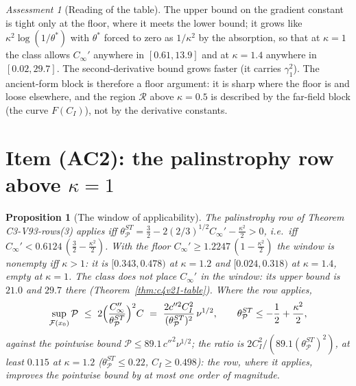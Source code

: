 \documentclass[11pt]{article}
\theoremstyle{plain}
\newtheorem{proposition}[theorem]{Proposition}
\theoremstyle{definition}
\theoremstyle{remark}
\newtheorem{assessment}[theorem]{Assessment}
\begin{document}
\begin{assessment}[Reading of the table]
\label{ass:c4v21-reading-table}
The upper bound on the gradient constant is tight only at the floor,
where it meets the lower bound; it grows like \(\kappa^2\log(1/\theta^*)\) with \(\theta^*\)
forced to zero as \(1/\kappa^2\) by the absorption, so that at \(\kappa=1\) the
class allows \(C_\infty'\) anywhere in \([0.61,13.9]\) and at \(\kappa=1.4\) anywhere in
\([0.02,29.7]\).  The second-derivative bound grows faster (it carries
\(\gamma_1^2\)).  The ancient-form block is therefore a floor argument: it
is sharp where the floor is and loose elsewhere, and the region \(\mathcal R\)
above \(\kappa=0.5\) is described by the far-field block (the curve \(F(C_I)\)),
not by the derivative constants.
\end{assessment}

\section{Item (AC2): the palinstrophy row above \texorpdfstring{\(\kappa=1\)}{kappa=1}}
\label{sec:c4v21-palinstrophy}

\begin{proposition}[The window of applicability]
\label{prop:c4v21-window}
The palinstrophy row of Theorem C3-V93-rows(3) applies iff
\(\theta_{\mathcal P}^{ST}=\frac32-2(2/3)^{1/2}C_\infty'-\frac{\kappa^2}2>0\), i.e.\ iff
\(C_\infty'<0.6124\,(\frac32-\frac{\kappa^2}2)\).  With the floor \(C_\infty'\ge1.2247\,(1-\frac{\kappa^2}2)\) the
window is nonempty iff \(\kappa>1\): it is \([0.343,0.478)\) at \(\kappa=1.2\) and
\([0.024,0.318)\) at \(\kappa=1.4\), empty at \(\kappa=1\).  The class does not place \(C_\infty'\)
in the window: its upper bound is \(21.0\) and \(29.7\) there
(Theorem~\ref{thm:c4v21-table}).  Where the row applies,
\begin{equation}
 \sup_{\mathcal F(x_0)}\mathcal P\ \le\ 2\Bigl(\frac{C_\infty''}{\theta_{\mathcal P}^{ST}}\Bigr)^2C
 \ =\ \frac{2c''^2C_I^2}{(\theta_{\mathcal P}^{ST})^2}\,\nu^{1/2},\qquad\theta_{\mathcal P}^{ST}\le-\frac12+\frac{\kappa^2}2 ,
 \label{eq:c4v21-palin}
\end{equation}
against the pointwise bound \(\mathcal P\le89.1\,c''^2\nu^{1/2}\); the ratio is
\(2C_I^2/(89.1(\theta_{\mathcal P}^{ST})^2)\), at least \(0.115\) at \(\kappa=1.2\) (\(\theta_{\mathcal P}^{ST}\le0.22\), \(C_I\ge0.498\)):
the row, where it applies, improves the pointwise bound by at most
one order of magnitude.
\end{proposition}
\end{document}
